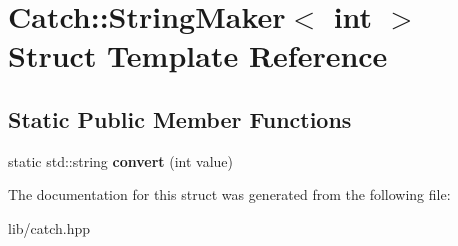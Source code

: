 \hypertarget{struct_catch_1_1_string_maker_3_01int_01_4}{}\section{Catch\+:\+:String\+Maker$<$ int $>$ Struct Template Reference}
\label{struct_catch_1_1_string_maker_3_01int_01_4}
\subsection*{Static Public Member Functions}
\begin{DoxyCompactItemize}
\item 
\mbox{\label{struct_catch_1_1_string_maker_3_01int_01_4_aab096e55fb7283f6ad47b5ca277e22e8}} 
static std\+::string {\bfseries convert} (int value)
\end{DoxyCompactItemize}


The documentation for this struct was generated from the following file\+:\begin{DoxyCompactItemize}
\item 
lib/catch.\+hpp\end{DoxyCompactItemize}
